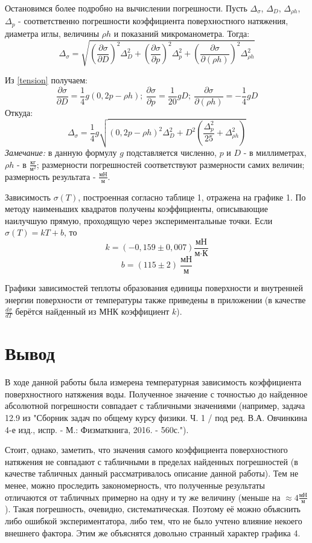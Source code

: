 \documentclass[15pt,a5paper,reqno]{article}
\begin{document}
    Остановимся более подробно на вычислении погрешности. Пусть $\Delta_{\sigma}$, $\Delta_D$, $\Delta_{\rho h}$, $\Delta_p$ - соответственно погрешности коэффициента поверхностного натяжения, диаметра иглы, величины $\rho h$ и показаний микроманометра. Тогда:
    \[\Delta_{\sigma} = \sqrt{\left(\frac{\partial\sigma}{\partial D}\right)^2\Delta_{D}^2 + \left(\frac{\partial\sigma}{\partial p}\right)^2\Delta_{p}^2 + \left(\frac{\partial\sigma}{\partial (\rho h)}\right)^2\Delta_{\rho h}^2}\]

    Из \eqref{tension} получаем:
    \[\frac{\partial\sigma}{\partial D} = \frac{1}{4}g(0,2p - \rho h);\ \frac{\partial\sigma}{\partial p} = \frac{1}{20}gD;\  \frac{\partial\sigma}{\partial (\rho h)} = -\frac{1}{4}gD\]
    Откуда:
    \[\Delta_{\sigma} = \frac{1}{4}g\sqrt{(0,2p - \rho h)^2\Delta_{D}^2 + D^2\left(\frac{\Delta_{p}^2}{25} + \Delta_{\rho h}^2\right)}\]
    \textit{Замечание:} в данную формулу $g$ подставляется численно, $p$ и $D$ - в миллиметрах, $\rho h$ - в $\frac{\text{кг}}{\text{м}^2}$; размерности погрешностей соответствуют размерности самих величин; размерность результата - $\frac{\text{мН}}{\text{м}}$.
    
    Зависимость $\sigma(T)$, построенная согласно таблице 1, отражена на графике 1. По методу наименьших квадратов получены коэффициенты, описывающие наилучшую прямую, проходящую через экспериментальные точки. Если $\sigma(T) = kT + b$, то
    \[k = (-0,159 \pm 0,007)\frac{\text{мН}}{\text{м}\cdot\text{К}}\]
    \[b = (115 \pm 2)\ \frac{\text{мН}}{\text{м}}\]
    
    Графики зависимостей теплоты образования единицы поверхности и внутренней энергии поверхности от температуры также приведены в приложении (в качестве $\frac{d\sigma}{dT}$ берётся найденный из МНК коэффициент $k$).

\section{Вывод}

    В ходе данной работы была измерена температурная зависимость коэффициента поверхностного натяжения воды. Полученное значение с точностью до найденное абсолютной погрешности совпадает с табличными значениями (например, задача 12.9 из "Сборник задач по общему курсу физики. Ч. 1 / под ред. В.А. Овчинкина 4-е изд., испр. - М.: Физматкнига, 2016. - 560с.").
    
    Стоит, однако, заметить, что значения самого коэффициента поверхностного натяжения не совпадают с табличными в пределах найденных погрешностей (в качестве табличных данный рассматривалось описание данной работы). Тем не менее, можно проследить закономерность, что полученные результаты отличаются от табличных примерно на одну и ту же величину (меньше на $\approx 4\frac{\text{мН}}{\text{м}}$). Такая погрешность, очевидно, систематическая. Поэтому её можно объяснить либо ошибкой экспериментатора, либо тем, что не было учтено влияние некоего внешнего фактора. Этим же объяснятся довольно странный характер графика 4.
\end{document}
